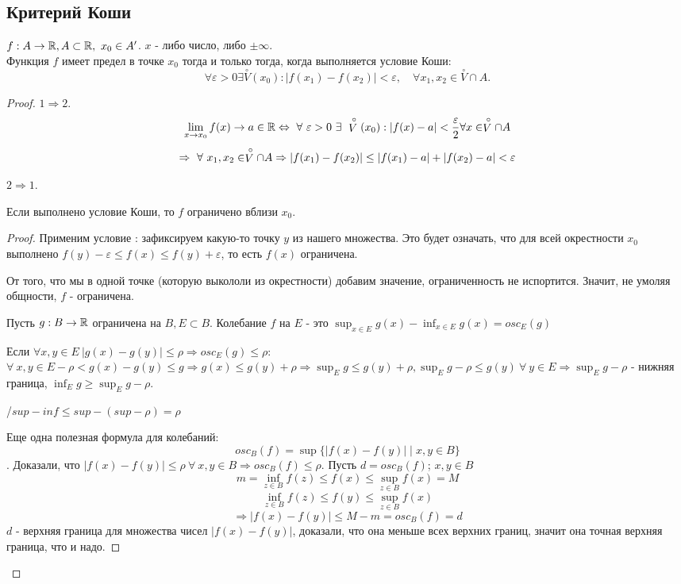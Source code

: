 \documentclass[12pt]{report}
\begin{document}
\subsection{Критерий Коши}\label{ques_29}
\begin{thm}
    $f: A \to \mathbb{R}, A \subset \mathbb{R}, ~x_0 \in A'$. $x$ - либо число, либо $\pm \infty$.\\
    Функция $f$ имеет предел в точке $x_0$ тогда и только тогда, когда выполняется условие Коши: 
    \[
	\forall \varepsilon >0 \exists \stackrel \circ V(x_0): |f(x_1) - f(x_2)| < \varepsilon , \quad \forall x_1, x_2 \in  \stackrel \circ V\cap A
    .\] 
\end{thm}
\begin{proof}
$1 \Rightarrow 2$.
$$\lim\limits_{x \to x_0}{f(x)} \to a \in \mathbb{R} \Leftrightarrow ~\forall ~\varepsilon > 0 ~\exists ~\stackrel \circ V(x_0) :|f(x) - a | < \frac{\varepsilon}{2} \forall x \in \stackrel \circ V \cap A$$
$$\Rightarrow ~\forall ~x_1, x_2 \in \stackrel \circ V \cap A \Rightarrow |f(x_1) - f(x_2)| \le |f(x_1) - a| + |f(x_2) - a| < \varepsilon$$

$2 \Rightarrow 1$. 
\begin{lm}
Если выполнено условие Коши, то $f$ ограничено вблизи $x_0$. 
\end{lm}
\begin{proof}
Применим условие : зафиксируем какую-то точку $y$ из нашего множества. Это будет означать, что для всей окрестности $x_0$ выполнено $f(y) - \varepsilon \le f(x) \le f(y) + \varepsilon$, то есть $f(x)$ ограничена.

От того, что мы в одной точке (которую выкололи из окрестности) добавим значение, ограниченность не испортится. Значит, не умоляя общности, $f$ -  ограничена.

\begin{defn}
Пусть $g: B \to \mathbb{R}$ ограничена на $B, E \subset B$. Колебание $f$ на $E$ - это $\sup_{x \in E}{g(x)} - \inf_{x \in E}{g(x)} = osc_E(g)$
\end{defn} 
Если $\forall x, y \in E ~ |g(x) - g(y)| \le \rho \Rightarrow osc_E(g) \le \rho$:
$\forall ~x, y \in E -\rho < g(x) - g(y) \le g \Rightarrow g(x) \le g(y) + \rho \Rightarrow \sup_E{g} \le g(y) + \rho, \sup_E{g} - \rho \le g(y) ~\forall ~y \in E \Rightarrow \sup_E{g} - \rho$ - нижняя граница, $\inf_E{g} \ge \sup_E{g} - \rho$.

/$sup - inf \le sup - (sup - \rho) = \rho$

Еще одна полезная формула для колебаний:
$$osc_B(f) = \sup{\{|f(x) - f(y)| \mid x, y \in B\}}$$.
Доказали, что $|f(x) - f(y)| \le \rho ~\forall ~x, y \in B \Rightarrow osc_B(f) \le \rho$. Пусть $d = osc_B(f)$; $x, y \in B$
$$m = \inf_{z \in B}{f(z)} \le f(x) \le \sup_{z \in B}{f(x)} = M$$
$$\inf_{z \in B}{f(z)} \le f(y) \le \sup_{z \in B}{f(x)}$$
$$\Rightarrow |f(x) - f(y)| \le M - m = osc_B(f) = d$$
$d$ - верхняя граница для множества чисел $|f(x) - f(y)|$, доказали, что она меньше всех верхних границ, значит она точная верхняя граница, что и надо.
\end{proof}


\end{proof}
\end{document}
